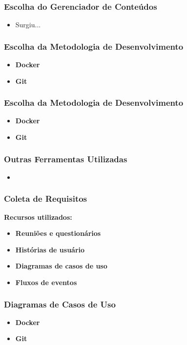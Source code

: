 \documentclass{beamer}
\begin{document}
\begin{frame}
    \frametitle{Escolha do Gerenciador de Conteúdos}
    \begin{itemize}
        \item Surgiu...
    \end{itemize}
\end{frame} 


\begin{frame}
    \frametitle{Escolha da Metodologia de Desenvolvimento}
    \begin{itemize}
        \item \textbf{Docker}
        \item \textbf{Git}
    \end{itemize}
\end{frame}


\begin{frame}
    \frametitle{Escolha da Metodologia de Desenvolvimento}
    \begin{itemize}
        \item \textbf{Docker}
        \item \textbf{Git}
    \end{itemize}
\end{frame}


\begin{frame}
    \frametitle{Outras Ferramentas Utilizadas}
    \begin{itemize}
        \item 
    \end{itemize}
\end{frame}


\begin{frame}
    \frametitle{Coleta de Requisitos}
    \textbf{Recursos utilizados:}
    \begin{itemize}
        \item \textbf{Reuniões e questionários}
        \item \textbf{Histórias de usuário}
        \item \textbf{Diagramas de casos de uso}
        \item \textbf{Fluxos de eventos}
    \end{itemize}
\end{frame}


\begin{frame}
    \frametitle{Diagramas de Casos de Uso}
    \begin{itemize}
        \item \textbf{Docker}
        \item \textbf{Git}
    \end{itemize}
\end{frame}
\end{document}

